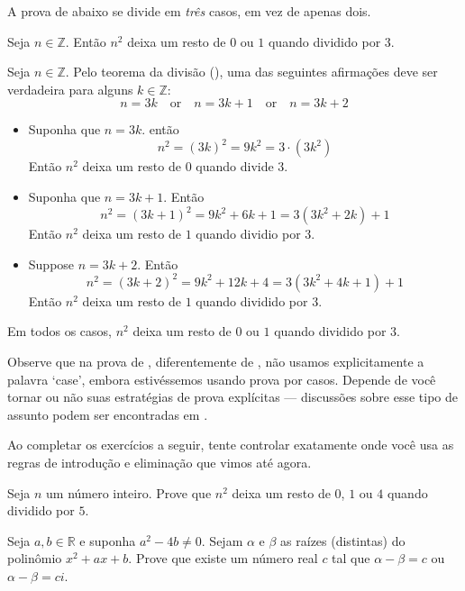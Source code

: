 \begin{estratégia}
A prova de  abaixo se divide em \textit{três} casos, em vez de apenas dois.

\begin{proposition}
\label{propRemainderOfSquaresModulo3}
Seja $n \in \mathbb{Z}$. Então $n^2$ deixa um resto de $0$ ou $1$ quando dividido por $3$.
\end{proposition}

\begin{cproof}
Seja $n \in \mathbb{Z}$. Pelo teorema da divisão (), uma das seguintes afirmações deve ser verdadeira para alguns $k \in \mathbb{Z}$:
\[
n=3k \quad \text{or} \quad n=3k+1 \quad \text{or} \quad n=3k+2
\]
\begin{itemize}
\item Suponha que $n=3k$. então
\[
n^2 = (3k)^2 = 9k^2 = 3 \cdot (3k^2)
\]
Então $n^2$ deixa um resto de $0$ quando divide $3$.
\item Suponha que $n=3k+1$. Então
\[
n^2 = (3k+1)^2 = 9k^2+6k+1 = 3(3k^2+2k)+1
\]
Então $n^2$ deixa um resto de $1$ quando dividio por $3$.
\item Suppose $n=3k+2$. Então
\[
n^2 = (3k+2)^2 = 9k^2+12k+4 = 3(3k^2+4k+1)+1
\]
Então $n^2$ deixa um resto de $1$ quando dividido por $3$.
\end{itemize}
Em todos os casos, $n^2$ deixa um resto de $0$ ou $1$ quando dividido por $3$.
\end{cproof}

Observe que na prova de , diferentemente de , não usamos explicitamente a palavra `case', embora estivéssemos usando prova por casos. Depende de você tornar ou não suas estratégias de prova explícitas --- discussões sobre esse tipo de assunto podem ser encontradas em .

Ao completar os exercícios a seguir, tente controlar exatamente onde você usa as regras de introdução e eliminação que vimos até agora.

\begin{exercise}
Seja $n$ um número inteiro. Prove que $n^2$ deixa um resto de $0$, $1$ ou $4$ quando dividido por $5$.
\end{exercise}

\begin{exercise}
Seja $a,b \in \mathbb{R}$ e suponha $a^2-4b \ne 0$. Sejam $\alpha$ e $\beta$ as raízes (distintas) do polinômio $x^2+ax+b$. Prove que existe um número real $c$ tal que $\alpha-\beta = c$ ou $\alpha - \beta = ci$.
\end{exercise}


\end{estratégia}
